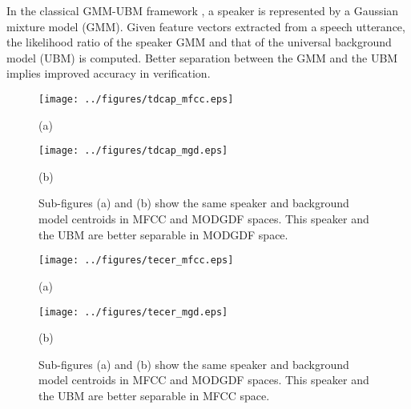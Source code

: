 \documentclass{article}
\begin{document}
In the classical GMM-UBM framework \cite{reynoldsAdaptedGMM}, a speaker is
represented by a Gaussian mixture model (GMM). Given feature vectors extracted
from a speech utterance, the likelihood ratio of the speaker GMM and that of the
universal background model (UBM) is computed. Better separation between the GMM
and the UBM implies improved accuracy in verification.

\begin{figure}[h]
\centering 
\begin{minipage}[c]{0.5\textwidth}
\centering 
    \texttt{[image: ../figures/tdcap\_mfcc.eps]}
	\caption*{(a)}
\end{minipage}%
\begin{minipage}[c]{0.35\textwidth}
\centering  
    \texttt{[image: ../figures/tdcap\_mgd.eps]}
	\caption*{(b)}
\end{minipage}
\caption{Sub-figures (a) and (b) show the same speaker and background model centroids in MFCC and MODGDF spaces. This speaker and the UBM are better separable in 
MODGDF space.}
\label{fig:ubm_sep1}
\end{figure}

\begin{figure}[h]
\centering 
\begin{minipage}[c]{0.45\textwidth}
\centering 
    \texttt{[image: ../figures/tecer\_mfcc.eps]}
	\caption*{(a)}
\end{minipage}%
\begin{minipage}[c]{0.45\textwidth}
\centering  
    \texttt{[image: ../figures/tecer\_mgd.eps]}
	\caption*{(b)}
\end{minipage}
\caption{Sub-figures (a) and (b) show the same speaker and background model centroids in MFCC and MODGDF spaces. This speaker and the UBM are better separable in 
MFCC space.}
\label{fig:ubm_sep2}
\end{figure}
\end{document}
